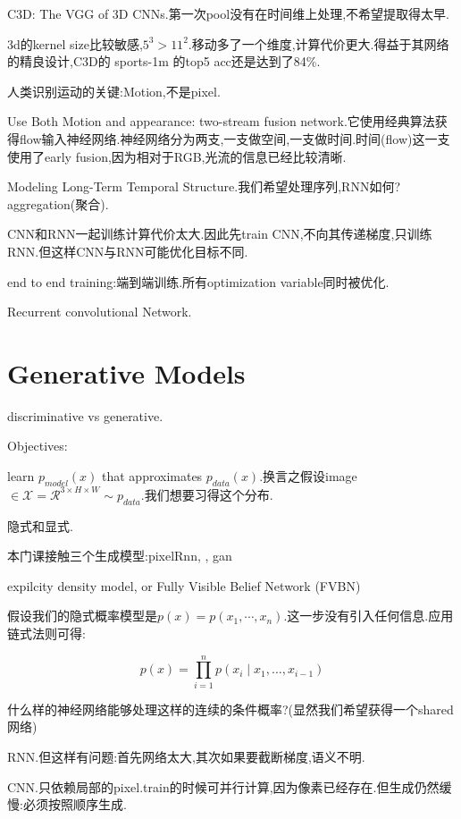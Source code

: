 	C3D: The VGG of 3D CNNs.第一次pool没有在时间维上处理,不希望提取得太早.
	
	3d的kernel size比较敏感,$5^3 > 11^2$.移动多了一个维度,计算代价更大.得益于其网络的精良设计,C3D的 sports-1m 的top5 acc还是达到了84\%.
	
	人类识别运动的关键:Motion,不是pixel.
	
	Use Both Motion and appearance: two-stream fusion network.它使用经典算法获得flow输入神经网络.神经网络分为两支,一支做空间,一支做时间.时间(flow)这一支使用了early fusion,因为相对于RGB,光流的信息已经比较清晰.
	
	Modeling Long-Term Temporal Structure.我们希望处理序列,RNN如何? aggregation(聚合).
	
	CNN和RNN一起训练计算代价太大.因此先train CNN,不向其传递梯度,只训练RNN.但这样CNN与RNN可能优化目标不同.
	
	end to end training:端到端训练.所有optimization variable同时被优化.
	
	Recurrent convolutional Network.
	
	\clearpage
	\section{Generative Models}
	discriminative vs generative.
	
	Objectives:
	
	learn $p_{model}(x)$ that approximates $p_{data}(x)$.换言之假设image$ \in \mathcal{X} = \mathcal{R}^{3\times H \times W}\sim p_{data}$.我们想要习得这个分布.
	
	隐式和显式.
	
	本门课接触三个生成模型:pixelRnn, , gan
	
	expilcity density model, or Fully Visible Belief Network (FVBN)
	
	假设我们的隐式概率模型是$p(x) = p(x_1, \cdots, x_n)$.这一步没有引入任何信息.应用链式法则可得:
	
	\begin{equation}
		p(x)=\prod_{i=1}^{n} p\left(x_{i} \mid x_{1}, \ldots, x_{i-1}\right)
	\end{equation}
	
	什么样的神经网络能够处理这样的连续的条件概率?(显然我们希望获得一个shared 网络)
	
	RNN.但这样有问题:首先网络太大,其次如果要截断梯度,语义不明.
	
	CNN.只依赖局部的pixel.train的时候可并行计算,因为像素已经存在.但生成仍然缓慢:必须按照顺序生成.
	
